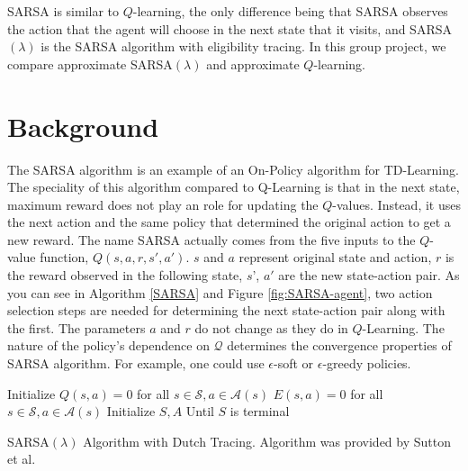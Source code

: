 \documentclass[10pt,conference]{IEEEtran}
\begin{document}
SARSA is similar to \(Q\)-learning, the only difference being that SARSA observes the action that the agent will choose
in the next state that it visits, and SARSA\((\lambda)\) is the SARSA algorithm with eligibility tracing.
In this group project, we compare approximate SARSA\((\lambda)\) and approximate \(Q\)-learning.

\label{sec:intro}

\section{Background}
\label{sec:background}
	
	The SARSA algorithm is an example of an On-Policy algorithm for TD-Learning\cite{sutton18}. The 
	speciality of this algorithm compared to Q-Learning is that in the next 
	state, maximum reward does not play an role for updating the \(Q\)-values. 
	Instead, it uses the next action and the same policy that determined the 
	original action to get a new reward. The name SARSA actually comes from the 
	five inputs to the \(Q\)-value function, \(Q(s, a, r, s', a')\). \(s\) and \(a\) represent original state 
	and action, \(r\) is the reward observed in the following state, \(s\)', \(a'\) are 
	the new state-action pair. As you can see in Algorithm \ref{SARSA} and Figure \ref{fig:SARSA-agent}, two 
	action selection steps are needed for determining the next state-action pair 
	along with the first. The parameters \(a\) and \(r\) do not change as they do in 
	\(Q\)-Learning. The nature of the policy's dependence on \(\mathcal{Q}\) determines 
	the convergence properties of SARSA algorithm. For example, one 
	could use \(\epsilon\)-soft or \(\epsilon\)-greedy policies. \cite{sutton18} 
	
	\begin{algorithm}
		\DontPrintSemicolon
		Initialize \(Q(s,a) = 0\) for all \(s \in \mathcal{S}, a \in \mathcal{A}(s)\)\;
		 {
			\(E(s, a) = 0\) for all \(s \in \mathcal{S}, a \in \mathcal{A}(s)\)\;
			Initialize \(S,A\)\;
			Until \(S\) is terminal\;
		}
		\caption{SARSA\((\lambda)\) Algorithm with Dutch Tracing.  Algorithm
		was provided by Sutton et al. \cite{sutton18}}
		\label{SARSA}
	\end{algorithm}
\end{document}
